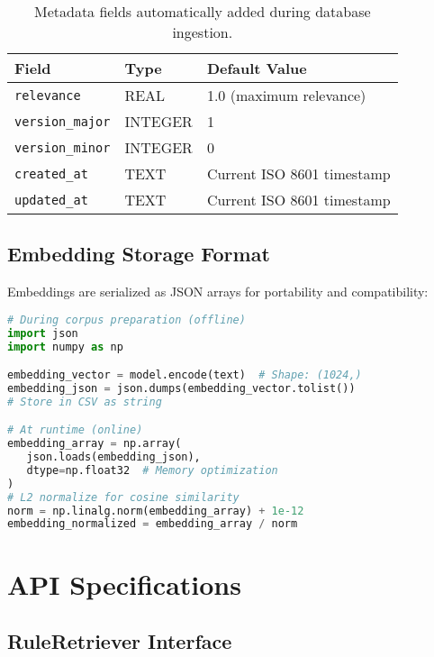 \begin{table}[!htbp]
\centering
\small
\begin{tabular}{p{3.5cm}p{2cm}p{6cm}}
\toprule
\textbf{Field} & \textbf{Type} & \textbf{Default Value} \\
\midrule
\texttt{relevance} & REAL & 1.0 (maximum relevance) \\
\texttt{version\_major} & INTEGER & 1 \\
\texttt{version\_minor} & INTEGER & 0 \\
\texttt{created\_at} & TEXT & Current ISO 8601 timestamp \\
\texttt{updated\_at} & TEXT & Current ISO 8601 timestamp \\
\bottomrule
\end{tabular}
\caption{Metadata fields automatically added during database ingestion.}
\label{tab:metadata-fields}
\end{table}

\subsection{Embedding Storage Format}

Embeddings are serialized as JSON arrays for portability and compatibility:

\begin{lstlisting}[language=Python, caption={Embedding serialization and deserialization}, label={lst:embedding-format}]
# During corpus preparation (offline)
import json
import numpy as np

embedding_vector = model.encode(text)  # Shape: (1024,)
embedding_json = json.dumps(embedding_vector.tolist())
# Store in CSV as string

# At runtime (online)
embedding_array = np.array(
   json.loads(embedding_json), 
   dtype=np.float32  # Memory optimization
)
# L2 normalize for cosine similarity
norm = np.linalg.norm(embedding_array) + 1e-12
embedding_normalized = embedding_array / norm
\end{lstlisting}

\clearpage
\section{API Specifications}
\label{sec:app-api}

\subsection{RuleRetriever Interface}


